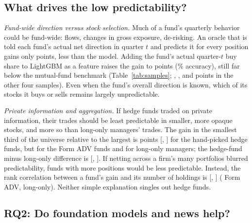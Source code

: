 

\subsection{What drives the low predictability?}

\emph{Fund-wide direction versus stock selection.} Much of a fund's quarterly
behavior could be fund-wide: flows, changes in gross exposure, de-risking. An
oracle that is told each fund's actual net direction in quarter $t$ and
predicts it for every position gains only \oraclegainM{} points, less than the
model. Adding the fund's actual quarter-$t$ buy share to LightGBM as a feature
raises the gain to \lgboraclegainM{} points (\lgboracleM\% accuracy), still
far below the mutual-fund benchmark (Table~\ref{tab:samples};
\lgboraclegainA{}, \lgboraclegainL{}, \lgboraclegainN{} and
\lgboraclegainP{} points in the other four samples). Even when the fund's
overall direction is known, which of its stocks it buys or sells remains
largely unpredictable.

\emph{Private information and aggregation.} If hedge funds traded on private
information, their trades should be least predictable in smaller, more opaque
stocks, and more so than long-only managers' trades. The gain in the smallest
third of the universe relative to the largest is \smlM{} points [\smlloM,
\smlhiM] for the hand-picked hedge funds, but \smlA{} for the Form ADV funds
and \smlL{} for long-only managers; the hedge-fund minus long-only difference
is \smldiffM{} [\smldiffloM, \smldiffhiM]. If netting across a firm's many
portfolios blurred predictability, funds with more positions would be less
predictable. Instead, the rank correlation between a fund's gain and its
number of holdings is \rhoholdingsM{} [\rhoholdingsloM, \rhoholdingshiM]
(\rhoholdingsA{} Form ADV, \rhoholdingsL{} long-only). Neither simple
explanation singles out hedge funds.

\subsection{RQ2: Do foundation models and news help?}

